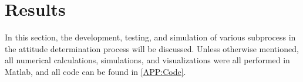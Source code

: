 \documentclass[11pt]{aiaa-tc}%
\begin{document}
%
%
%
%
%
%

\section{Results}
In this section, the development, testing, and simulation of various subprocess in the attitude determination process will be discussed. Unless otherwise mentioned, all numerical calculations, simulations, and visualizations were all performed in Matlab, and all code can be found in \ref{APP:Code}.
\end{document}
